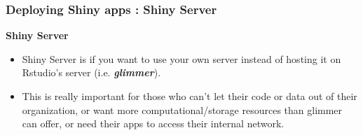 \documentclass{beamer}
\begin{document}
\begin{frame}
	\frametitle{Deploying Shiny apps : Shiny Server}
	\Large
	\textbf{Shiny Server}
	\begin{itemize}
		
		
		\item Shiny Server is if you want to use your own server instead of hosting it on Rstudio's server (i.e. \textbf{\textit{glimmer}}). 
		
		\item  This is really important for those who can't let their code or data out of their organization, 
		or want more computational/storage resources than glimmer can offer, or need their apps to access their 
		internal network.
	\end{itemize}
\end{frame}
\end{document}
